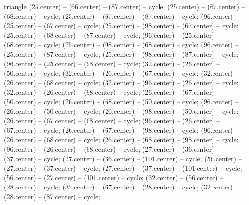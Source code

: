 {\begin{pgfonlayer}{triangle}
 (25.center) -- (66.center) -- (87.center) -- cycle; 
 (25.center) -- (67.center) -- (68.center) -- cycle; 
 (25.center) -- (67.center) -- (87.center) -- cycle; 
 (96.center) -- (25.center) -- (67.center) -- cycle; 
 (25.center) -- (98.center) -- (67.center) -- cycle; 
 (25.center) -- (68.center) -- (87.center) -- cycle; 
 (96.center) -- (25.center) -- (68.center) -- cycle; 
 (25.center) -- (98.center) -- (68.center) -- cycle; 
 (96.center) -- (25.center) -- (87.center) -- cycle; 
 (25.center) -- (98.center) -- (87.center) -- cycle; 
 (96.center) -- (25.center) -- (98.center) -- cycle; 
 (32.center) -- (26.center) -- (50.center) -- cycle; 
 (32.center) -- (26.center) -- (67.center) -- cycle; 
 (32.center) -- (26.center) -- (68.center) -- cycle; 
 (32.center) -- (96.center) -- (26.center) -- cycle; 
 (32.center) -- (26.center) -- (98.center) -- cycle; 
 (26.center) -- (67.center) -- (50.center) -- cycle; 
 (26.center) -- (68.center) -- (50.center) -- cycle; 
 (96.center) -- (26.center) -- (50.center) -- cycle; 
 (26.center) -- (98.center) -- (50.center) -- cycle; 
 (26.center) -- (67.center) -- (68.center) -- cycle; 
 (96.center) -- (26.center) -- (67.center) -- cycle; 
 (26.center) -- (67.center) -- (98.center) -- cycle; 
 (96.center) -- (26.center) -- (68.center) -- cycle; 
 (26.center) -- (68.center) -- (98.center) -- cycle; 
 (96.center) -- (26.center) -- (98.center) -- cycle; 
 (27.center) -- (36.center) -- (37.center) -- cycle; 
 (27.center) -- (36.center) -- (101.center) -- cycle; 
 (56.center) -- (27.center) -- (37.center) -- cycle; 
 (27.center) -- (37.center) -- (101.center) -- cycle; 
 (56.center) -- (27.center) -- (101.center) -- cycle; 
 (32.center) -- (56.center) -- (28.center) -- cycle; 
 (32.center) -- (67.center) -- (28.center) -- cycle; 
 (32.center) -- (28.center) -- (87.center) -- cycle; 

\end{pgfonlayer}}
